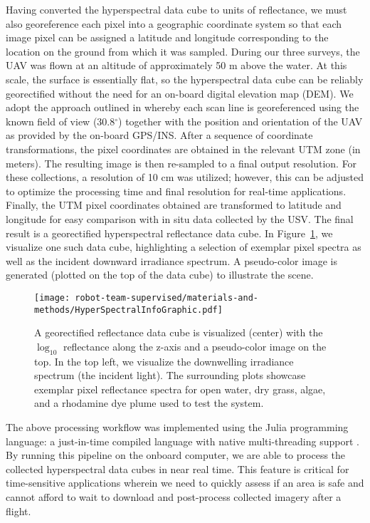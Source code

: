 Having converted the hyperspectral data cube to units of reflectance, we must also georeference each pixel into a geographic coordinate system so that each image pixel can be assigned a latitude and longitude corresponding to the location on the ground from which it was sampled. During our three surveys, the UAV was flown at an altitude of approximately %
50 m above the water. At this scale, the surface is essentially flat, so the hyperspectral data cube can be reliably georectified without the need for an on-board digital elevation map (DEM). We adopt the approach outlined in \cite{GeorectificationMuller, GeorectificationBaumker, GeorectificationMostafa} whereby each scan line is georeferenced using the known field of view (30.8$^\circ$) together with the position and orientation of the UAV as provided by the on-board GPS/INS. After a sequence of coordinate transformations, the pixel coordinates are obtained in the relevant UTM zone (in meters). The resulting image is then re-sampled to a final output resolution. For these collections, a resolution of 10 cm was utilized; however, this can be adjusted to optimize the processing time and final resolution for real-time applications. Finally, the UTM pixel coordinates obtained are transformed to latitude and longitude for easy comparison with in situ data collected by the USV. The final result is a georectified hyperspectral reflectance data cube. In Figure~\ref{fig:hsi-infographic}, we visualize one such data cube, highlighting a selection of exemplar pixel spectra as well as the incident downward irradiance spectrum. A pseudo-color image is generated (plotted on the top of the data cube) to illustrate the scene.

\begin{figure}[H]
\centering
\vspace{-0.1in}
\texttt{[image: robot-team-supervised/materials-and-methods/HyperSpectralInfoGraphic.pdf]}
\caption{A georectified reflectance data cube is visualized (center) with the $\log_{10}$ reflectance along the z-axis and a pseudo-color image on the top. In the top left, we visualize the downwelling irradiance spectrum (the incident light). The surrounding plots showcase exemplar pixel reflectance spectra for open water, dry grass, algae, and a rhodamine dye plume used to test the system.\label{fig:hsi-infographic}}
\end{figure}  

The above processing workflow was implemented using the Julia programming language: a just-in-time compiled language with native multi-threading support \cite{julia-1}. By running this pipeline on the onboard computer, we are able to process the collected hyperspectral data cubes in near real time. This feature is critical for time-sensitive applications wherein we need to quickly assess if an area is safe and cannot afford to wait to download and post-process collected imagery after a flight.

